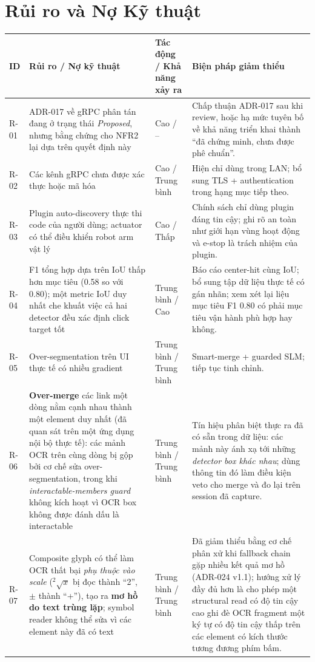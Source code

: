 \documentclass[11pt,a4paper]{report}
\newcommand{\code}[1]{\texttt{#1}}
\begin{document}
\chapter{Rủi ro và Nợ Kỹ thuật}
\begin{longtable}{@{}p{1.2cm}p{5.0cm}p{2.0cm}p{5.6cm}@{}}
\toprule
\textbf{ID} & \textbf{Rủi ro / Nợ kỹ thuật} & \textbf{Tác động / Khả năng xảy ra} & \textbf{Biện pháp giảm thiểu} \\
\midrule
\endhead
R-01 & ADR-017 về gRPC phân tán đang ở trạng thái \emph{Proposed}, nhưng bằng chứng cho NFR2 lại dựa trên quyết định này & Cao / -- & Chấp thuận ADR-017 sau khi review, hoặc hạ mức tuyên bố về khả năng triển khai thành ``đã chứng minh, chưa được phê chuẩn''. \\
R-02 & Các kênh gRPC chưa được xác thực hoặc mã hóa & Cao / Trung bình & Hiện chỉ dùng trong LAN; bổ sung TLS + authentication trong hạng mục tiếp theo. \\
R-03 & Plugin auto-discovery thực thi code của người dùng; actuator có thể điều khiển robot arm vật lý & Cao / Thấp & Chính sách chỉ dùng plugin đáng tin cậy; ghi rõ an toàn như giới hạn vùng hoạt động và e-stop là trách nhiệm của plugin. \\
R-04 & F1 tổng hợp dựa trên IoU thấp hơn mục tiêu (0.58 so với 0.80); một metric IoU duy nhất che khuất việc cả hai detector đều xác định click target tốt & Trung bình / Cao & Báo cáo center-hit cùng IoU; bổ sung tập dữ liệu thực tế có gán nhãn; xem xét lại liệu mục tiêu F1 0.80 có phải mục tiêu vận hành phù hợp hay không. \\
R-05 & Over-segmentation trên UI thực tế có nhiều gradient & Trung bình / Trung bình & Smart-merge + guarded SLM; tiếp tục tinh chỉnh. \\
R-06 & \textbf{Over-merge} các link một dòng nằm cạnh nhau thành một element duy nhất (đã quan sát trên một ứng dụng nội bộ thực tế): các mảnh OCR trên cùng dòng bị gộp bởi cơ chế sửa over-segmentation, trong khi \emph{interactable-members guard} không kích hoạt vì OCR box không được đánh dấu là interactable & Trung bình / Trung bình & Tín hiệu phân biệt thực ra đã có sẵn trong dữ liệu: các mảnh này ánh xạ tới những \emph{detector box khác nhau}; dùng thông tin đó làm điều kiện veto cho merge và đo lại trên session đã capture. \\
R-07 & Composite glyph có thể làm OCR thất bại \emph{phụ thuộc vào scale} (\code{$^2\sqrt{x}$} bị đọc thành ``2'', \code{$\pm$} thành ``+''), tạo ra \textbf{mơ hồ do text trùng lặp}; symbol reader không thể sửa vì các element này đã có text & Trung bình / Trung bình & Đã giảm thiểu bằng cơ chế phân xử khi fallback chain gặp nhiều kết quả mơ hồ (ADR-024 v1.1); hướng xử lý đầy đủ hơn là cho phép một structural read có độ tin cậy cao ghi đè OCR fragment một ký tự có độ tin cậy thấp trên các element có kích thước tương đương phím bấm. \\

\end{longtable}
\end{document}
